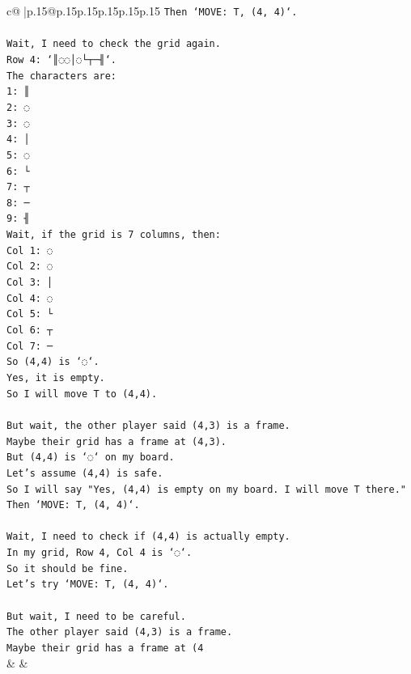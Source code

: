 \documentclass{article}
\begin{document}
{\begin{supertabular}{c@{$\;$}|p{.15\linewidth}@{}p{.15\linewidth}p{.15\linewidth}p{.15\linewidth}p{.15\linewidth}p{.15\linewidth}}
{{{\texttt{Then `MOVE: T, (4, 4)`.} \\
\\ 
\texttt{Wait, I need to check the grid again.} \\
\texttt{Row 4: `║◌◌│◌└┬─╢`.} \\
\texttt{The characters are:} \\
\texttt{1: ║} \\
\texttt{2: ◌} \\
\texttt{3: ◌} \\
\texttt{4: │} \\
\texttt{5: ◌} \\
\texttt{6: └} \\
\texttt{7: ┬} \\
\texttt{8: ─} \\
\texttt{9: ╢} \\
\texttt{Wait, if the grid is 7 columns, then:} \\
\texttt{Col 1: ◌} \\
\texttt{Col 2: ◌} \\
\texttt{Col 3: │} \\
\texttt{Col 4: ◌} \\
\texttt{Col 5: └} \\
\texttt{Col 6: ┬} \\
\texttt{Col 7: ─} \\
\texttt{So (4,4) is `◌`.} \\
\texttt{Yes, it is empty.} \\
\texttt{So I will move T to (4,4).} \\
\\ 
\texttt{But wait, the other player said (4,3) is a frame.} \\
\texttt{Maybe their grid has a frame at (4,3).} \\
\texttt{But (4,4) is `◌` on my board.} \\
\texttt{Let's assume (4,4) is safe.} \\
\texttt{So I will say "Yes, (4,4) is empty on my board. I will move T there."} \\
\texttt{Then `MOVE: T, (4, 4)`.} \\
\\ 
\texttt{Wait, I need to check if (4,4) is actually empty.} \\
\texttt{In my grid, Row 4, Col 4 is `◌`.} \\
\texttt{So it should be fine.} \\
\texttt{Let's try `MOVE: T, (4, 4)`.} \\
\\ 
\texttt{But wait, I need to be careful.} \\
\texttt{The other player said (4,3) is a frame.} \\
\texttt{Maybe their grid has a frame at (4} \\
            }
        }
    }
    & & \\ \\


\end{supertabular}}
\end{document}
